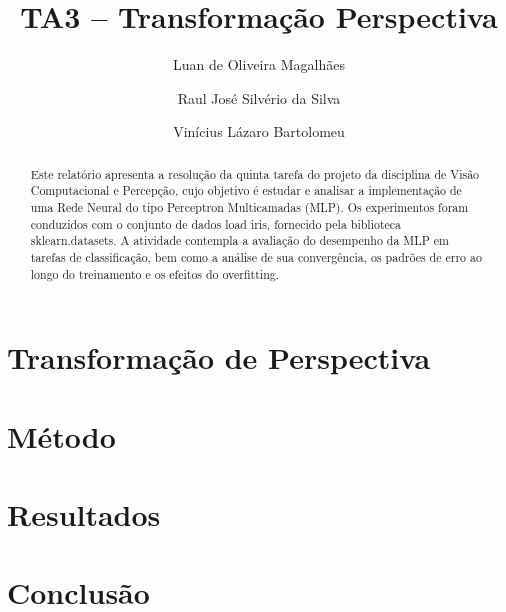 \documentclass[sigconf,nonacm]{acmart}
\begin{document}
\title{TA3 – Transformação Perspectiva}

\author{Luan de Oliveira Magalhães}

\author{Raul José Silvério da Silva}

\author{Vinícius Lázaro Bartolomeu}

\begin{abstract}
Este relatório apresenta a resolução da quinta tarefa do projeto da disciplina de Visão Computacional e Percepção, cujo objetivo é estudar e analisar a implementação de uma Rede Neural do tipo Perceptron Multicamadas (MLP). Os experimentos foram conduzidos com o conjunto de dados load iris, fornecido pela biblioteca sklearn.datasets. A atividade contempla a avaliação do desempenho da MLP em tarefas de classificação, bem como a análise de sua convergência, os padrões de erro ao longo do treinamento e os efeitos do overfitting.
\end{abstract}


\maketitle


\section{Transformação de Perspectiva}



\section{Método}



\section{Resultados}




\section{Conclusão}



\end{document}
